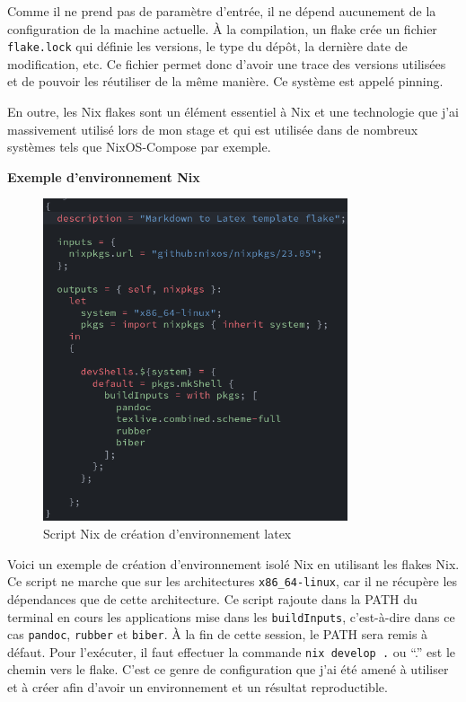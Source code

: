 \documentclass[a4paper,french,12pt, titlepage]{article}
\begin{document}
Comme il ne prend pas de paramètre d'entrée, il ne dépend aucunement de
la configuration de la machine actuelle. À la compilation, un flake crée
un fichier \texttt{flake.lock} qui définie les versions, le type du
dépôt, la dernière date de modification, etc. Ce fichier permet donc
d'avoir une trace des versions utilisées et de pouvoir les réutiliser de
la même manière. Ce système est appelé \gls{pinning}.\newline

En outre, les Nix flakes sont un élément essentiel à Nix et une
technologie que j'ai massivement utilisé lors de mon stage et qui est
utilisée dans de nombreux systèmes tels que NixOS-Compose par
exemple.\newline

\textbf{Exemple d'environnement Nix}\newline

\begin{figure}[h]
\centering
\includegraphics[width=0.8\textwidth,height=0.8\textheight,keepaspectratio]{images/flakebasenix.png}
\caption{Script Nix de création d'environnement latex}
\end{figure}

Voici un exemple de création d'environnement isolé Nix en utilisant les
flakes Nix. Ce script ne marche que sur les architectures
\texttt{x86\_64-linux}, car il ne récupère les dépendances que de cette
architecture. Ce script rajoute dans la PATH du terminal en cours les
applications mise dans les \texttt{buildInputs}, c'est-à-dire dans ce
cas \texttt{pandoc}, \texttt{rubber} et \texttt{biber}. À la fin de
cette session, le PATH sera remis à défaut. Pour l'exécuter, il faut
effectuer la commande \texttt{nix\ develop\ .} ou ``.'' est le chemin
vers le flake. C'est ce genre de configuration que j'ai été amené à
utiliser et à créer afin d'avoir un environnement et un résultat
reproductible.\newline
\end{document}
